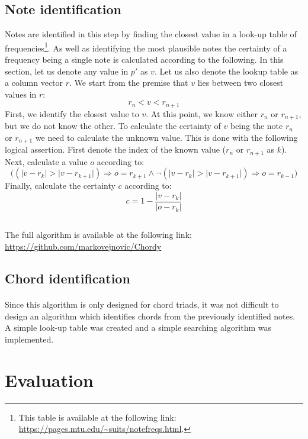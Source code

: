 \documentclass{article}
\providecommand{\abs}[1]{\lvert#1\rvert}
\begin{document}
\subsection{Note identification}
Notes are identified in this step by finding the closest value in a look-up 
table of frequencies\footnote{This table is available at the following link: 
\url{https://pages.mtu.edu/~suits/notefreqs.html}.}. As well as identifying 
the most plausible notes the certainty of a frequency being a single note is 
calculated according to the following. In this section, let us denote any 
value in $p'$ as $v$. Let us also denote the lookup table as a column vector 
$r$. We start from the premise that $v$ lies between two closest values in $r$:
$$r_n < v < r_{n+1}$$
First, we identify the closest value to $v$. At this point, we know either 
$r_n$ or $r_{n+1}$, but we do not know the other. To calculate the certainty 
of $v$ being the note $r_n$ or $r_{n+1}$ we need to calculate the unknown 
value. This is done with the following logical assertion. First denote the 
index of the known value ($r_n$ or $r_{n+1}$ as $k$). Next, calculate a value 
$o$ according to:
$$\Big((\abs{v - r_k} > \abs{v - r_{k+1}}) \Rightarrow o = r_{k+1} \land 
\neg (\abs{v - r_k} > \abs{v - r_{k+1}}) \Rightarrow o = r_{k-1}\Big)$$
Finally, calculate the certainty $c$ according to:
$$c = 1 - \frac{\abs{v - r_k}}{\abs{o - r_k}}$$

\subsection*{}
\paragraph*{}
The full algorithm is available at the following link:
\url{https://github.com/markovejnovic/Chordy}

\subsection{Chord identification}
\paragraph*{}
Since this algorithm is only designed for chord triads, it was not difficult 
to design an algorithm which identifies chords from the previously identified 
notes. A simple look-up table was created and a simple searching algorithm was 
implemented.

\section{Evaluation}
\end{document}

